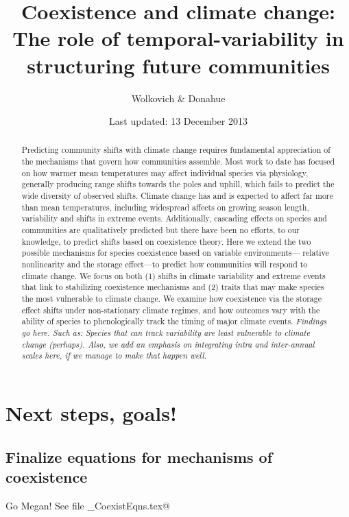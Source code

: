 \documentclass[11pt,a4paper,oneside]{article}
\begin{document}
\renewcommand{\labelitemi}{$-$}
\title{Coexistence and climate change: \\The role of
    temporal-variability in structuring future communities}
    \author{Wolkovich \& Donahue}
\date{Last updated: 13 December 2013}
\maketitle

\begin{abstract} Predicting community shifts
with climate change requires fundamental appreciation of the
mechanisms that govern how communities assemble. Most work to date has
focused on how warmer mean temperatures may affect individual species
via physiology, generally producing range shifts towards the poles and
uphill, which fails to predict the wide diversity of observed shifts.
Climate change has and is expected to affect far more than mean
temperatures, including widespread affects on growing season
length, variability and shifts in extreme events. Additionally,
cascading effects on species and communities are qualitatively
predicted but there have been no efforts, to our knowledge, to predict
shifts based on coexistence theory. Here we extend the two possible
mechanisms for species coexistence based on variable environments---
relative nonlinearity and the storage effect---to predict how
communities will respond to climate change. We focus on both (1) shifts in
climate variability and extreme events that link to
stabilizing coexistence mechanisms and (2) traits that may
make species the most vulnerable to climate change. We examine how
coexistence via the storage effect shifts under non-stationary climate regimes, and how outcomes vary with the
ability of species to phenologically track the timing of major climate events. \emph{Findings go here. Such as: Species that can track variability are least vulnerable to climate change (perhaps).  Also, we add an emphasis on integrating intra and inter-annual scales here, if we manage to make that happen well.}
\end{abstract}

\newpage
\tableofcontents

\section{Next steps, goals!}
\subsection{Finalize equations for mechanisms of coexistence}
Go Megan! See file \verb@VarEnv_CoexistEqns.tex@
\end{document}
